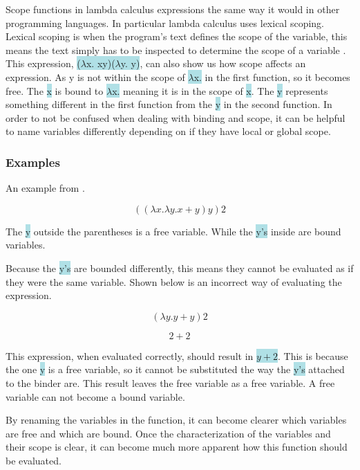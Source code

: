 \documentclass{article}
\begin{document}
Scope functions in lambda calculus expressions the same way it would in other programming languages. In particular lambda calculus uses lexical scoping. Lexical scoping is when the program's text defines the scope of the variable, this means the text simply has to be inspected to determine the scope of a variable \cite{TLC}. This expression, \colorbox{powderblue}{($\lambda$x. xy)($\lambda$y. y)}, can also show us how scope affects an expression. As y is not within the scope of  \colorbox{powderblue}{$\lambda$x.} in the first function, so it becomes free. The \colorbox{powderblue}{x} is bound to \colorbox{powderblue}{$\lambda$x.} meaning it is in the scope of \colorbox{powderblue}{x}. The  \colorbox{powderblue}{y} represents something different in the first function from the  \colorbox{powderblue}{y} in the second function. In order to not be confused when dealing with binding and scope, it can be helpful to name variables differently depending on if they have local or global scope.

\subsubsection{Examples}

An example from \cite{PL}. \newline

\[((\lambda x. \lambda y. x + y)y)2 \] \newline

The  \colorbox{powderblue}{y} outside the parentheses is a free variable. While the  \colorbox{powderblue}{y's} inside are bound variables. 

Because the \colorbox{powderblue}{y's} are bounded differently, this means they cannot be evaluated as if they were the same variable. Shown below is an incorrect way of evaluating the expression. \newline

\[(\lambda y. y + y)2\]

\[2 + 2\] \newline

This expression, when evaluated correctly, should result in \colorbox{powderblue}{$y + 2$}. This is because the one \colorbox{powderblue}{y} is a free variable, so it cannot be substituted the way the \colorbox{powderblue}{y's} attached to the binder are. This result leaves the free variable as a free variable. A free variable can not become a bound variable. 

By renaming the variables in the function, it can become clearer which variables are free and which are bound. Once the characterization of the variables and their scope is clear, it can become much more apparent how this function should be evaluated. \newline
\end{document}
